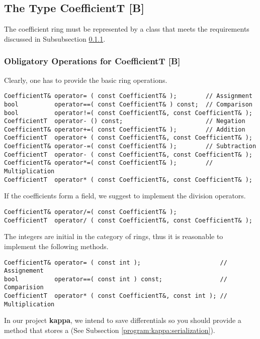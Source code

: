 \subsection{The Type CoefficientT [B]}
\label{program:libhomology:CoefficientT}

The coefficient ring must be represented by a class that meets the requirements discussed in Subsubsection \ref{program:libhomology:CoefficientT:obligatory_reqs}.

\subsubsection{Obligatory Operations for CoefficientT [B]}
\label{program:libhomology:CoefficientT:obligatory_reqs}
Clearly, one has to provide the basic ring operations.
\begin{lstlisting}
CoefficientT& operator= ( const CoefficientT& );        // Assignment
bool          operator==( const CoefficientT& ) const;  // Comparison
bool          operator!=( const CoefficientT&, const CoefficientT& );
CoefficientT  operator- () const;                       // Negation
CoefficientT& operator+=( const CoefficientT& );        // Addition
CoefficientT  operator+ ( const CoefficientT&, const CoefficientT& );
CoefficientT& operator-=( const CoefficientT& );        // Subtraction
CoefficientT  operator- ( const CoefficientT&, const CoefficientT& );
CoefficientT& operator*=( const CoefficientT& );        // Multiplication
CoefficientT  operator* ( const CoefficientT&, const CoefficientT& );
\end{lstlisting}
If the coefficients form a field, we suggest to implement the division operators.
\begin{lstlisting}
CoefficientT& operator/=( const CoefficientT& );
CoefficientT  operator/ ( const CoefficientT&, const CoefficientT& );
\end{lstlisting}

The integers are initial in the category of rings, thus it is reasonable to implement the following methods.
\begin{lstlisting}
CoefficientT& operator= ( const int );                      // Assignement
bool          operator==( const int ) const;                // Comparision
CoefficientT  operator* ( const CoefficientT&, const int ); // Multiplication
\end{lstlisting}

In our project {\bf kappa}, we intend to save differentials so you should provide a method that stores a  (See Subsection \ref{program:kappa:serialization}).


